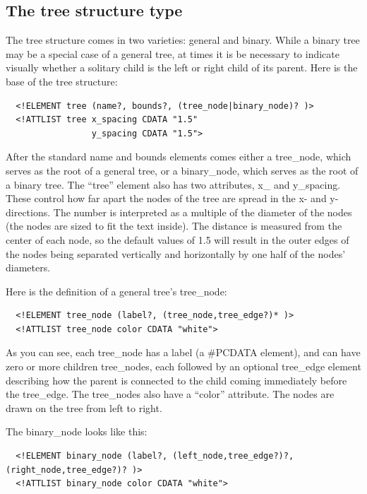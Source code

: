\documentclass[11pt,letterpaper]{book}
\begin{document}
\subsection{The tree structure type}


The tree structure comes in two varieties: general and binary. While a
binary tree may be a special case of a general tree, at times it is
be necessary to indicate visually whether a solitary child is the left
or right child of its parent. Here is the base of the tree structure:


\footnotesize \begin{verbatim}
  <!ELEMENT tree (name?, bounds?, (tree_node|binary_node)? )>
  <!ATTLIST tree x_spacing CDATA "1.5"
                 y_spacing CDATA "1.5">
\end{verbatim} \normalsize
  
  After the standard name and bounds elements comes either a
  tree\_node, which serves as the root of a general tree, or a
  binary\_node, which serves as the root of a binary tree. The
  ``tree'' element also has two attributes, x\_ and y\_spacing. These
  control how far apart the nodes of the tree are spread in the x-
  and y-directions. The number is interpreted as a multiple of the
  diameter of the nodes (the nodes are sized to fit the text inside).
  The distance is measured from the center of each node, so the
  default values of 1.5 will result in the outer edges of the nodes
  being separated vertically and horizontally by one half of the
  nodes' diameters.

Here is the definition of a general tree's tree\_node:


\footnotesize \begin{verbatim}
  <!ELEMENT tree_node (label?, (tree_node,tree_edge?)* )>
  <!ATTLIST tree_node color CDATA "white">
\end{verbatim} \normalsize

As you can see, each tree\_node has a label (a \#PCDATA element), and
can have zero or more children tree\_nodes, each followed by an
optional tree\_edge element describing how the parent is connected to
the child coming immediately before the tree\_edge. The tree\_nodes also
have a ``color'' attribute. The nodes are drawn on the tree from left
to right.

The binary\_node looks like this:

\footnotesize \begin{verbatim}
  <!ELEMENT binary_node (label?, (left_node,tree_edge?)?, (right_node,tree_edge?)? )>
  <!ATTLIST binary_node color CDATA "white">
\end{verbatim} \normalsize  
\end{document}
